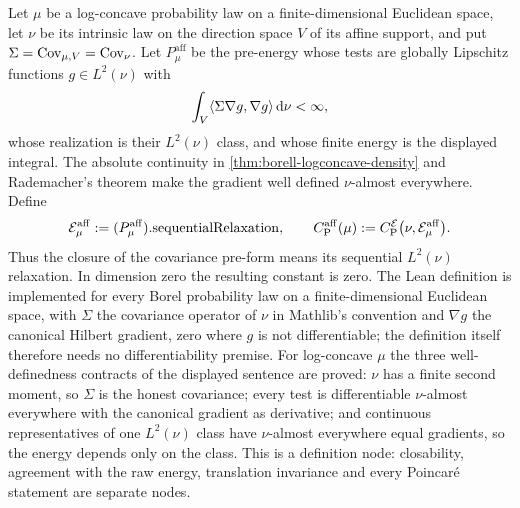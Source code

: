 \begin{definition}
  \label{def:affine-poincare-constant}
  \leanok
  Let $\mu$ be a log-concave probability law on a finite-dimensional Euclidean space, let $\nu$ be
  its intrinsic law on the direction space $V$ of its affine support, and put
  $\Sigma=\operatorname{Cov}_{\mu,V}=\operatorname{Cov}_\nu$.
  Let $P^{\mathrm{aff}}_\mu$ be the pre-energy whose tests are globally Lipschitz functions
  $g\in L^2(\nu)$ with
  \[
    \int_V\langle\Sigma\nabla g,\nabla g\rangle\,\mathrm d\nu<\infty,
  \]
  whose realization is their $L^2(\nu)$ class, and whose finite energy is the displayed integral.
  The absolute continuity in \cref{thm:borell-logconcave-density} and Rademacher's theorem make the
  gradient well defined $\nu$-almost everywhere.  Define
  \[
    \mathcal E^{\mathrm{aff}}_\mu
      :=(P^{\mathrm{aff}}_\mu).\mathrm{sequentialRelaxation},
    \qquad
    C_{\mathrm P}^{\mathrm{aff}}(\mu)
      :=C_{\mathrm P}^{\mathcal E}\bigl(\nu,\mathcal E^{\mathrm{aff}}_\mu\bigr).
  \]
  Thus the closure of the covariance pre-form means its sequential $L^2(\nu)$ relaxation.  In
  dimension zero the resulting constant is zero.
  The Lean definition is implemented for every Borel probability law on a finite-dimensional
  Euclidean space, with $\Sigma$ the covariance operator of $\nu$ in Mathlib's convention and
  $\nabla g$ the canonical Hilbert gradient, zero where $g$ is not differentiable; the definition
  itself therefore needs no differentiability premise.  For log-concave $\mu$ the three
  well-definedness contracts of the displayed sentence are proved: $\nu$ has a finite second
  moment, so $\Sigma$ is the honest covariance; every test is differentiable $\nu$-almost
  everywhere with the canonical gradient as derivative; and continuous representatives of one
  $L^2(\nu)$ class have $\nu$-almost everywhere equal gradients, so the energy depends only on
  the class.  This is a definition node: closability, agreement with the raw energy, translation
  invariance and every Poincar\'e statement are separate nodes.
\end{definition}

